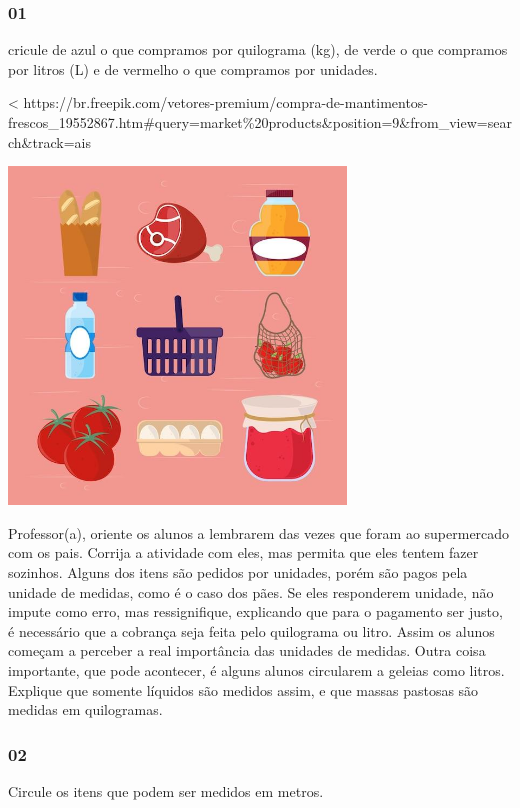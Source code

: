 \subsubsection{01}\label{section-27}

cricule de azul o que compramos por quilograma (kg), de verde o que
compramos por litros (L) e de vermelho o que compramos por unidades.

\textless{}
https://br.freepik.com/vetores-premium/compra-de-mantimentos-frescos\_19552867.htm\#query=market\%20products\&position=9\&from\_view=search\&track=ais

\includegraphics[width=3.53125in,height=3.53125in]{media/image23.jpg}

Professor(a), oriente os alunos a lembrarem das vezes que foram ao
supermercado com os pais. Corrija a atividade com eles, mas permita que
eles tentem fazer sozinhos. Alguns dos itens são pedidos por unidades,
porém são pagos pela unidade de medidas, como é o caso dos pães. Se eles
responderem unidade, não impute como erro, mas ressignifique, explicando
que para o pagamento ser justo, é necessário que a cobrança seja feita
pelo quilograma ou litro. Assim os alunos começam a perceber a real
importância das unidades de medidas. Outra coisa importante, que pode
acontecer, é alguns alunos circularem a geleias como litros. Explique
que somente líquidos são medidos assim, e que massas pastosas são
medidas em quilogramas.

\subsubsection{02}\label{section-28}

Circule os itens que podem ser medidos em metros.


